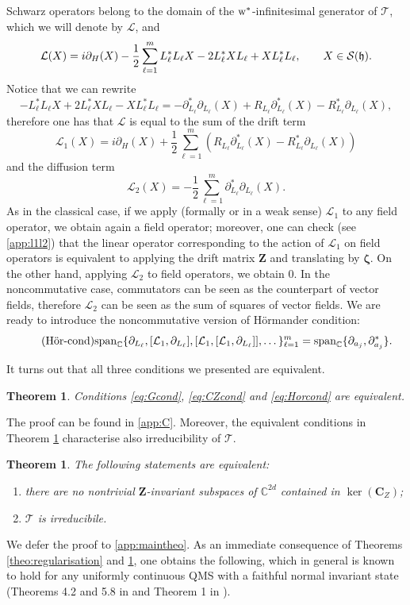 \documentclass[preprint]{elsarticle}
\newtheorem{theo}[defi]{Theorem}
\theoremstyle{definition}
\def\hh{\mathfrak{h} }
\def\CC{\mathbb{C}}
\def\TT{\mathcal{T}}
\def\LL{\mathcal{L}}
\def\hh{\mathfrak{h}}
\begin{document}
Schwarz operators belong to the domain of the ${\rm w}^*$-infinitesimal generator of $\TT$, which we will denote by $\LL$, and
$$\LL(X)=i\partial_H(X)-\frac{1}{2}\sum_{\ell=1}^{m}L_\ell^*L_\ell X -2L_\ell^* X L_\ell + X L_\ell^*L_\ell, \qquad X \in {\cal S}(\hh).$$
Notice that we can rewrite
$$-L_\ell^*L_\ell X +2L_\ell^* X L_\ell -X L_\ell^*L_\ell=-\partial_{L_\ell}^*\partial_{L_\ell}(X)+R_{L_\ell}\partial_{L_\ell}^*(X)-R^*_{L_\ell}\partial_{L_\ell}(X),$$
therefore one has that $\LL$ is equal to the sum of the drift term
$$\LL_1(X)=i\partial_H(X)+\frac{1}{2}\sum_{\ell=1}^{m}(R_{L_\ell}\partial_{L_\ell}^*(X)-R_{L_\ell}^*\partial_{L_\ell}(X))$$
and the diffusion term
$$\LL_2(X)=-\frac{1}{2}\sum_{\ell=1}^m\partial^*_{L_\ell}\partial_{L_\ell}(X).$$
As in the classical case, if we apply (formally or in a weak sense) $\LL_1$ to any field operator, we obtain again a field operator; moreover, one can check (see \ref{app:l1l2}) that the linear operator corresponding to the action of $\LL_1$ on field operators is equivalent to applying the drift matrix $\mathbf{Z}$ and translating by $\boldsymbol{\zeta}$. On the other hand, applying $\LL_2$ to field operators, we obtain $0$. In the noncommutative case, commutators can be seen as the counterpart of vector fields, therefore $\LL_2$ can be seen as the sum of squares of vector fields. We are ready to introduce the noncommutative version of H\"ormander condition:
\begin{equation}\tag{H\"or-cond} \label{eq:Horcond}
    {\rm span}_{\CC}\{\partial_{L_\ell}, [\LL_1,\partial_{L_\ell}], [\LL_1,[\LL_1,\partial_{L_\ell}]], \dots\}_{\ell=1}^{m}={\rm span}_{\CC}\{\partial_{a_j}, \partial^*_{a_j}\}.
\end{equation}

It turns out that all three conditions we presented are equivalent.

\begin{theo} \label{th:equivcond}
Conditions \eqref{eq:Gcond}, \eqref{eq:CZcond} and \eqref{eq:Horcond} are equivalent.
\end{theo}

The proof can be found in \ref{app:C}. Moreover, the equivalent conditions  in Theorem \ref{th:equivcond} characterise  also irreducibility of $\TT.$ 

\begin{theo} \label{theo:main}
The following statements are equivalent:
\begin{enumerate}
\item there are no nontrivial $\mathbf{Z}$-invariant subspaces of $\CC^{2d}$ contained in $\ker(\mathbf{C}_{Z})$;
\item $\TT$ is irreducibile.
\end{enumerate}
\end{theo}
We defer the proof to \ref{app:maintheo}. As an immediate consequence of Theorems \ref{theo:regularisation} and \ref{theo:main}, one obtains the following, which in general is known to hold for any uniformly continuous QMS with a faithful normal invariant state (Theorems 4.2 and 5.8 in \cite{FG25} and Theorem 1 in \cite{CJ20}).
\end{document}
